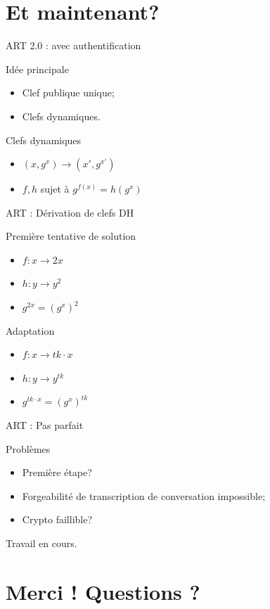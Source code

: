 \documentclass{beamer}
\newcommand{\ra}{\rightarrow}
\begin{document}
\section{Et maintenant?}
\begin{frame}{ART 2.0 : avec authentification}
	\begin{block}{Idée principale}
		\begin{itemize}
			\item Clef publique unique;
			\item Clefs dynamiques.
		\end{itemize}
	\end{block}
	\pause
	\begin{block}{Clefs dynamiques}
		\begin{itemize}
			\item $(x, g^x) \ra (x', g^{x'})$
			\item $f, h$ sujet à $g^{f(x)} = h(g^x)$
		\end{itemize}
	\end{block}
\end{frame}

\begin{frame}{ART : Dérivation de clefs DH}
	\begin{block}{Première tentative de solution}
		\begin{itemize}
			\item $f : x \ra 2x$
			\item $h : y \ra y^2$
			\item $g^{2x} = (g^x)^2$
		\end{itemize}
	\end{block}
	\pause
	\begin{block}{Adaptation}
		\begin{itemize}
			\item $f : x \ra tk\cdot x$
			\item $h : y \ra y^{tk}$
			\item $g^{tk\cdot x} = (g^x)^{tk}$
		\end{itemize}
	\end{block}
\end{frame}

\begin{frame}{ART : Pas parfait}
	\begin{block}{Problèmes}
		\begin{itemize}
			\item Première étape?
			\item Forgeabilité de transcription de conversation impossible;
			\item Crypto faillible?
		\end{itemize}
	\end{block}
	\center
	Travail en cours.
\end{frame}
\section*{Merci ! Questions ?}

\begin{frame}
  \begin{small}

    
    
	\end{small}
\end{frame}
\end{document}
